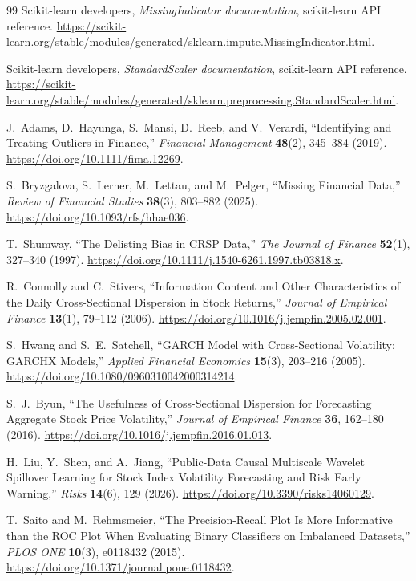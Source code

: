 \documentclass[11pt,a4paper]{article}
\begin{document}
\begin{thebibliography}{99}
Scikit-learn developers,
\emph{MissingIndicator documentation}, scikit-learn API reference.
\url{https://scikit-learn.org/stable/modules/generated/sklearn.impute.MissingIndicator.html}.

Scikit-learn developers,
\emph{StandardScaler documentation}, scikit-learn API reference.
\url{https://scikit-learn.org/stable/modules/generated/sklearn.preprocessing.StandardScaler.html}.

J.~Adams, D.~Hayunga, S.~Mansi, D.~Reeb, and V.~Verardi,
``Identifying and Treating Outliers in Finance,''
\emph{Financial Management} \textbf{48}(2), 345--384 (2019).
\url{https://doi.org/10.1111/fima.12269}.

S.~Bryzgalova, S.~Lerner, M.~Lettau, and M.~Pelger,
``Missing Financial Data,''
\emph{Review of Financial Studies} \textbf{38}(3), 803--882 (2025).
\url{https://doi.org/10.1093/rfs/hhae036}.

T.~Shumway,
``The Delisting Bias in CRSP Data,''
\emph{The Journal of Finance} \textbf{52}(1), 327--340 (1997).
\url{https://doi.org/10.1111/j.1540-6261.1997.tb03818.x}.

R.~Connolly and C.~Stivers,
``Information Content and Other Characteristics of the Daily Cross-Sectional Dispersion in Stock Returns,''
\emph{Journal of Empirical Finance} \textbf{13}(1), 79--112 (2006).
\url{https://doi.org/10.1016/j.jempfin.2005.02.001}.

S.~Hwang and S.~E.~Satchell,
``GARCH Model with Cross-Sectional Volatility: GARCHX Models,''
\emph{Applied Financial Economics} \textbf{15}(3), 203--216 (2005).
\url{https://doi.org/10.1080/0960310042000314214}.

S.~J.~Byun,
``The Usefulness of Cross-Sectional Dispersion for Forecasting Aggregate Stock Price Volatility,''
\emph{Journal of Empirical Finance} \textbf{36}, 162--180 (2016).
\url{https://doi.org/10.1016/j.jempfin.2016.01.013}.

H.~Liu, Y.~Shen, and A.~Jiang,
``Public-Data Causal Multiscale Wavelet Spillover Learning for Stock Index Volatility Forecasting and Risk Early Warning,''
\emph{Risks} \textbf{14}(6), 129 (2026).
\url{https://doi.org/10.3390/risks14060129}.

T.~Saito and M.~Rehmsmeier,
``The Precision-Recall Plot Is More Informative than the ROC Plot When Evaluating Binary Classifiers on Imbalanced Datasets,''
\emph{PLOS ONE} \textbf{10}(3), e0118432 (2015).
\url{https://doi.org/10.1371/journal.pone.0118432}.


\end{thebibliography}
\end{document}
